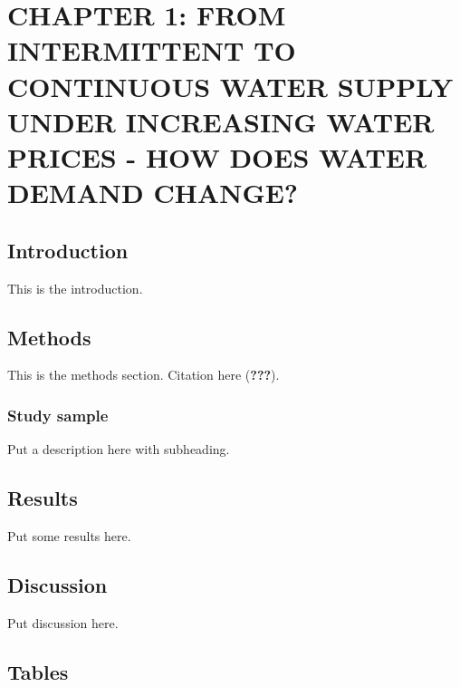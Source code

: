\documentclass[12pt,report]{uncdissertation}
\begin{document}
\chapter{\uppercase{Chapter 1: From intermittent to continuous water supply under increasing water prices - How does water demand change?}}

\hypertarget{introduction-1}{%
\section{Introduction}\label{introduction-1}}

This is the introduction.

\hypertarget{methods}{%
\section{Methods}\label{methods}}

This is the methods section. Citation here ({\textbf{???}}).

\hypertarget{study-sample}{%
\subsection{Study sample}\label{study-sample}}

Put a description here with subheading.

\hypertarget{results}{%
\section{Results}\label{results}}

Put some results here.

\hypertarget{discussion}{%
\section{Discussion}\label{discussion}}

Put discussion here.

\hypertarget{tables}{%
\section{Tables}\label{tables}}

\singlespace
\end{document}
